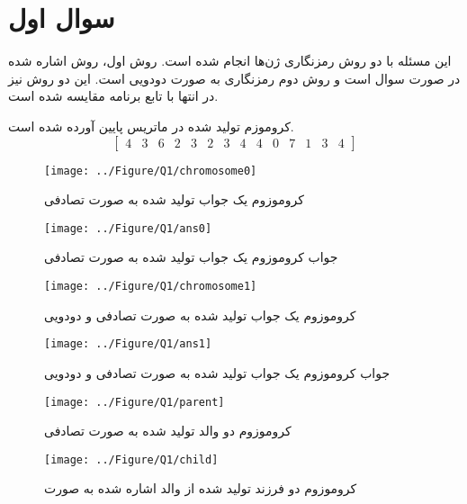 \section{سوال اول}
این مسئله با دو روش رمزنگاری
ژن‌ها انجام شده است. روش اول، روش اشاره شده در صورت سوال است و روش دوم رمزنگاری به صورت دودویی
 است. این دو روش نیز در انتها با تابع 
 برنامه
 مقایسه شده است.

کروموزم تولید شده در ماتریس پایین آورده شده است.
$$
\begin{bmatrix}
	4 & 3 & 6 & 2 & 3 & 2 & 3 & 4 & 4 & 0 & 7 & 1 & 3 & 4 
\end{bmatrix}
$$
\begin{figure}[H]
 	\caption{کروموزوم یک جواب تولید شده به صورت تصادفی} 
 	\vspace{-3cm}
 	\centering 
 	\texttt{[image: ../Figure/Q1/chromosome0]} 
 \end{figure}
\vspace{-3cm}
\begin{figure}[H]
	\caption{جواب کروموزوم یک جواب تولید شده به صورت تصادفی} 
	\centering 
	\texttt{[image: ../Figure/Q1/ans0]} 
\end{figure}

\begin{figure}[H]
	\caption{کروموزوم یک جواب تولید شده به صورت تصادفی و دودویی} 
		\vspace{-3cm}
	\centering 
	\texttt{[image: ../Figure/Q1/chromosome1]} 
\end{figure}
\vspace{-3cm}
\begin{figure}[H]
	\caption{جواب کروموزوم یک جواب تولید شده به صورت تصادفی و دودویی} 
	\centering 
	\texttt{[image: ../Figure/Q1/ans1]} 
\end{figure}

\begin{figure}[H]
	\caption{کروموزوم دو والد تولید شده به صورت تصادفی} 
	\vspace{-3cm}
	\centering 
	\texttt{[image: ../Figure/Q1/parent]} 
\end{figure}
\vspace{-3cm}
\begin{figure}[H]
	\caption{کروموزوم دو فرزند تولید شده از والد اشاره شده به صورت } 
	\vspace{-3cm}
	\centering 
	\texttt{[image: ../Figure/Q1/child]} 
\end{figure}

